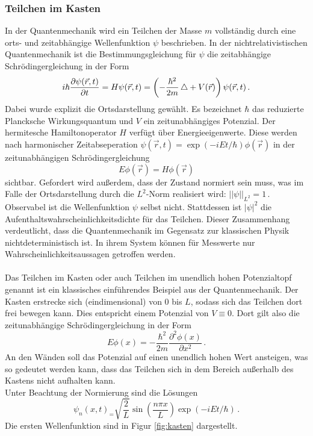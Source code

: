 \subsubsection{Teilchen im Kasten}
\label{subsubsec:kasten}
In der Quantenmechanik wird ein Teilchen der Masse $m$ vollständig durch eine orts- und zeitabhängige Wellenfunktion $\psi$ beschrieben. In der nichtrelativistischen Quantenmechanik ist die Bestimmungsgleichung für $\psi$ die zeitabhängige Schrödingergleichung in der Form
\begin{equation}
  i \hbar \frac{\partial \psi(\vec{r},t)}{\partial t} = H \psi(\vec{r},t) = \left(- \frac{\hbar^2}{2 m} \mathop{}\!\mathbin\bigtriangleup + V(\vec{r})\right) \psi(\vec{r},t)\,.
  \label{eqn:schroedingerZeitabhaengig}
\end{equation}
Dabei wurde explizit die Ortsdarstellung gewählt. Es bezeichnet $\hbar$ das reduzierte Plancksche Wirkungsquantum und $V$ ein zeitunabhängiges Potenzial. Der hermitesche Hamiltonoperator $H$ verfügt über Energieeigenwerte. Diese werden nach harmonischer Zeitabseperation $\psi(\vec{r},t) = \exp(-i E t / \hbar) \phi(\vec{r})$ in der zeitunabhängigen Schrödingergleichung
\begin{equation}
  E \phi(\vec{r}) = H \phi(\vec{r})
  \label{eqn:schroedingerZeitunabhaengig}
\end{equation}
sichtbar. Gefordert wird außerdem, dass der Zustand normiert sein muss, was im Falle der Ortsdarstellung durch die $L^2$-Norm realisiert wird: $\lvert\lvert \psi \rvert\rvert_{L^2} = 1\,.$ Observabel ist die Wellenfunktion $\psi$ selbst nicht. Stattdessen ist $\lvert \psi \rvert ^2$ die Aufenthaltswahrscheinlichkeitsdichte für das Teilchen. Dieser Zusammenhang verdeutlicht, dass die Quantenmechanik im Gegensatz zur klassischen Physik nichtdeterministisch ist. In ihrem System können für Messwerte nur Wahrscheinlichkeitsaussagen getroffen werden.
\\\\
Das Teilchen im Kasten oder auch Teilchen im unendlich hohen Potenzialtopf genannt ist ein klassisches einführendes Beispiel aus der Quantenmechanik. Der Kasten erstrecke sich (eindimensional) von 0 bis $L$, sodass sich das Teilchen dort frei bewegen kann. Dies entspricht einem Potenzial von $V \equiv 0$. Dort gilt also die zeitunabhängige Schrödingergleichung in der Form
\begin{equation}
  E \phi(x) = - \frac{\hbar^2}{2 m}  \frac{\partial^2 \phi(x)} {\partial x^2} \,.
  \label{eqn:schroedingerKasten}
\end{equation}
An den Wänden soll das Potenzial auf einen unendlich hohen Wert ansteigen, was so gedeutet werden kann, dass das Teilchen sich in dem Bereich außerhalb des Kastens nicht aufhalten kann.\\
Unter Beachtung der Normierung sind die Lösungen
\begin{equation}
  \psi_n(x,t)_ = \sqrt{\frac{2}{L}} \sin\left(\frac{n \pi x}{L}\right) \exp(-i E t / \hbar)\,.
  \label{eqn:kastenLoesung}
\end{equation}
Die ersten Wellenfunktion sind in Figur \ref{fig:kasten} dargestellt.

